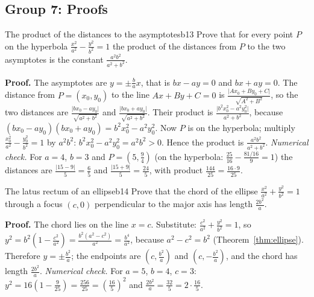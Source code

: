 \documentclass[11pt]{article}
\begin{document}
\subsection*{Group 7: Proofs}

\begin{exmp}{The product of the distances to the asymptotes}{b13}
Prove that for every point $P$ on the hyperbola $\frac{x^2}{a^2}-\frac{y^2}{b^2}=1$ the product of the distances from $P$ to the two asymptotes is the constant $\frac{a^2b^2}{a^2+b^2}$.

\textbf{Proof.} The asymptotes are $y=\pm\frac bax$, that is $bx-ay=0$ and $bx+ay=0$. The distance from $P=(x_0,y_0)$ to the line $Ax+By+C=0$ is $\frac{\lvert Ax_0+By_0+C\rvert}{\sqrt{A^2+B^2}}$, so the two distances are $\frac{\lvert bx_0-ay_0\rvert}{\sqrt{a^2+b^2}}$ and $\frac{\lvert bx_0+ay_0\rvert}{\sqrt{a^2+b^2}}$. Their product is $\frac{\lvert b^2x_0^2-a^2y_0^2\rvert}{a^2+b^2}$, because $(bx_0-ay_0)(bx_0+ay_0)=b^2x_0^2-a^2y_0^2$. Now $P$ is on the hyperbola; multiply $\frac{x_0^2}{a^2}-\frac{y_0^2}{b^2}=1$ by $a^2b^2$: $b^2x_0^2-a^2y_0^2=a^2b^2>0$. Hence the product is $\frac{a^2b^2}{a^2+b^2}$.
\emph{Numerical check.} For $a=4$, $b=3$ and $P=\left(5,\frac94\right)$ (on the hyperbola: $\frac{25}{16}-\frac{81/16}{9}=1$) the distances are $\frac{\lvert15-9\rvert}5=\frac65$ and $\frac{\lvert15+9\rvert}5=\frac{24}5$, with product $\frac{144}{25}=\frac{16\cdot9}{25}$.
\end{exmp}

\begin{exmp}{The latus rectum of an ellipse}{b14}
Prove that the chord of the ellipse $\frac{x^2}{a^2}+\frac{y^2}{b^2}=1$ through a focus $(c,0)$ perpendicular to the major axis has length $\frac{2b^2}a$.

\textbf{Proof.} The chord lies on the line $x=c$. Substitute: $\frac{c^2}{a^2}+\frac{y^2}{b^2}=1$, so $y^2=b^2\left(1-\frac{c^2}{a^2}\right)=\frac{b^2\left(a^2-c^2\right)}{a^2}=\frac{b^4}{a^2}$, because $a^2-c^2=b^2$ (Theorem~\ref{thm:ellipse}). Therefore $y=\pm\frac{b^2}a$; the endpoints are $\left(c,\frac{b^2}a\right)$ and $\left(c,-\frac{b^2}a\right)$, and the chord has length $\frac{2b^2}a$.
\emph{Numerical check.} For $a=5$, $b=4$, $c=3$: $y^2=16\left(1-\frac9{25}\right)=\frac{256}{25}=\left(\frac{16}5\right)^2$ and $\frac{2b^2}a=\frac{32}5=2\cdot\frac{16}5$.
\end{exmp}
\end{document}
